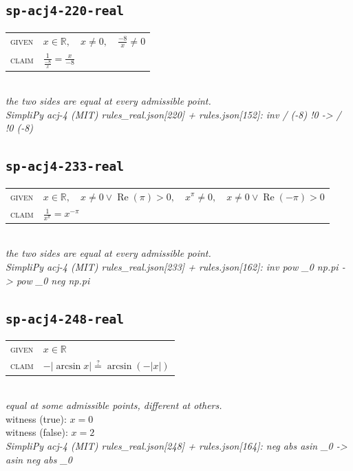 \documentclass[11pt]{article}
\begin{document}
\subsection*{\texttt{sp-acj4-220-real}}
\begin{tabular}{@{}l@{\quad}l@{}}
\textsc{given} & $x \in \mathbb{R},\quad x \neq 0,\quad \frac{-8}{x} \neq 0$ \\[4pt]
\textsc{claim} & $\displaystyle \frac{1}{\frac{-8}{x}} = \frac{x}{-8}$ \\
\end{tabular}\\[2pt]
{\small\emph{the two sides are equal at every admissible point.}}\\
\emph{SimpliPy acj-4 (MIT) rules\_real.json[220] + rules.json[152]: inv / (-8) !0  ->  / !0 (-8)}\\

\subsection*{\texttt{sp-acj4-233-real}}
\begin{tabular}{@{}l@{\quad}l@{}}
\textsc{given} & $x \in \mathbb{R},\quad x \neq 0 \lor \operatorname{Re}\left(\pi\right) > 0,\quad x^{\pi} \neq 0,\quad x \neq 0 \lor \operatorname{Re}\left(-\pi\right) > 0$ \\[4pt]
\textsc{claim} & $\displaystyle \frac{1}{x^{\pi}} = x^{-\pi}$ \\
\end{tabular}\\[2pt]
{\small\emph{the two sides are equal at every admissible point.}}\\
\emph{SimpliPy acj-4 (MIT) rules\_real.json[233] + rules.json[162]: inv pow \_0 np.pi  ->  pow \_0 neg np.pi}\\

\subsection*{\texttt{sp-acj4-248-real}}
\begin{tabular}{@{}l@{\quad}l@{}}
\textsc{given} & $x \in \mathbb{R}$ \\[4pt]
\textsc{claim} & $\displaystyle -\left|\arcsin x\right| \overset{?}{=} \arcsin\left(-\left|x\right|\right)$ \\
\end{tabular}\\[2pt]
{\small\emph{equal at some admissible points, different at others.}}\\
{\footnotesize\color{gray}witness (true): $x = 0$}\\
{\footnotesize\color{gray}witness (false): $x = 2$}\\
\emph{SimpliPy acj-4 (MIT) rules\_real.json[248] + rules.json[164]: neg abs asin \_0  ->  asin neg abs \_0}\\
\end{document}
